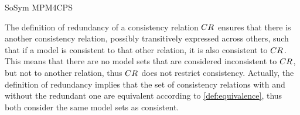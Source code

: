 \begin{copiedFrom}{SoSym MPM4CPS}
\begin{definition}
\end{definition}

The definition of redundancy of a consistency relation $CR_{}$ ensures that there is another consistency relation, possibly transitively expressed across others, such that if a model is consistent to that other relation, it is also consistent to $CR_{}$.
This means that there are no model sets that are considered inconsistent to $CR_{}$, but not to another relation, thus $CR_{}$ does not restrict consistency.
Actually, the definition of redundancy implies that the set of consistency relations with and without the redundant one are equivalent according to \autoref{def:equivalence}, thus both consider the same model sets as consistent.


\end{copiedFrom}
